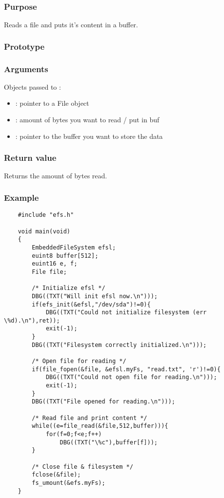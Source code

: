 \subsubsection*{Purpose}
Reads a file and puts it's content in a buffer.
\subsubsection*{Prototype}
\subsubsection*{Arguments}
Objects passed to :
\begin{itemize}
	\item{: pointer to a File object}
	\item{: amount of bytes you want to read / put in buf}
	\item{: pointer to the buffer you want to store the data}
\end{itemize}
\subsubsection*{Return value}
Returns the amount of bytes read.
\subsubsection*{Example}
\lstset{numbers=left, stepnumber=1, numberstyle=\small, numbersep=5pt, tabsize=4}
\begin{lstlisting}
	#include "efs.h"

	void main(void)
	{
		EmbeddedFileSystem efsl;
		euint8 buffer[512];
		euint16 e, f;
		File file;

		/* Initialize efsl */
		DBG((TXT("Will init efsl now.\n")));
		if(efs_init(&efsl,"/dev/sda")!=0){
			DBG((TXT("Could not initialize filesystem (err \%d).\n"),ret));
			exit(-1);
		}
		DBG((TXT("Filesystem correctly initialized.\n")));

		/* Open file for reading */
		if(file_fopen(&file, &efsl.myFs, "read.txt", 'r')!=0){
			DBG((TXT("Could not open file for reading.\n")));
			exit(-1);
		}
		DBG((TXT("File opened for reading.\n")));

		/* Read file and print content */
		while((e=file_read(&file,512,buffer))){
			for(f=0;f<e;f++)
				DBG((TXT("\%c"),buffer[f]));
		}

		/* Close file & filesystem */
		fclose(&file);
		fs_umount(&efs.myFs);
	}
\end{lstlisting}
